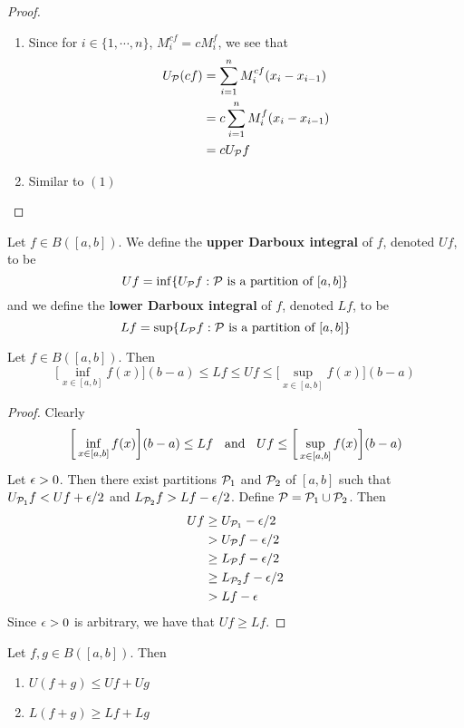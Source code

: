 \documentclass{book}
\begin{document}
	\begin{proof}\
		\begin{enumerate}
			\item Since for $i \in \{1, \cdots, n\}$, $M^{cf}_i = cM^f_i$, we see that  
			\begin{align*}
				U_{\mathcal{P}} (cf) 
				&= \sum_{i=1}^n M^{cf}_i (x_i - x_{i-1}) \\
				&= c \sum_{i=1}^n M^f_i (x_i - x_{i-1}) \\
				&= c U_{\mathcal{P}} f
			\end{align*}
			\item Similar to $(1)$
		\end{enumerate}
	\end{proof}
	
	\begin{defn}  
		Let $f \in B([a,b])$. We define the \textbf{upper Darboux integral} of $f$, denoted $U f$, to be $$Uf = \inf \{U_{\mathcal{P}} f: \mathcal{P} \text{ is a partition of } [a,b]\}$$
		and we define the \textbf{lower Darboux integral} of $f$, denoted $L f$, to be $$Lf = \sup \{L_{\mathcal{P}} f: \mathcal{P} \text{ is a partition of } [a,b]\}$$ 
	\end{defn}

	\begin{ex}  
		Let $f \in B([a,b])$. Then $$ \bigg[\inf_{x \in [a,b]} f(x) \bigg] (b-a) \leq Lf \leq Uf \leq \bigg[\sup_{x \in [a,b]} f(x) \bigg] (b-a)$$
	\end{ex}

	\begin{proof}
		Clearly $$\bigg[\inf_{x \in [a,b]} f(x) \bigg] (b-a) \leq Lf \hspace{.2cm } \text{ and } \hspace{.2cm } Uf \leq \bigg[\sup_{x \in [a,b]} f(x) \bigg] (b-a)$$ 
		Let $\epsilon >0$. Then there exist partitions $\mathcal{P}_1$ and $\mathcal{P}_2$ of $[a,b]$ such that $U_{\mathcal{P}_1} f < U f + \epsilon/2$ and $L_{\mathcal{P}_2} f > Lf - \epsilon/2 $. Define $\mathcal{P} = \mathcal{P}_1 \cup \mathcal{P}_2$. Then 
		\begin{align*}
			Uf 
			& \geq U_{\mathcal{P}_1}  - \epsilon/2 \\
			&> U_{\mathcal{P}} f - \epsilon/2 \\
			&\geq L_{\mathcal{P}} f -\epsilon/2 \\
			&\geq L_{\mathcal{P}_2} f -\epsilon/2 \\
			&> L f - \epsilon
		\end{align*} 
		Since $\epsilon >0$ is arbitrary, we have that $Uf \geq Lf$.
	\end{proof}

	\begin{ex}  
		Let $f, g \in B([a,b])$. Then 
		\begin{enumerate}
			\item $U(f+g) \leq U f + U g$
			\item $L(f+g) \geq L f + L g$
		\end{enumerate}
	\end{ex}
\end{document}
